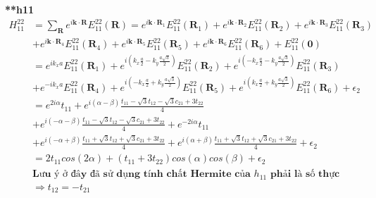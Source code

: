 \documentclass{report}
\begin{document}
\textbf{**h11}
\begin{align*}
    H^{22}_{11} & = \sum_{\mathbf{R}} e^{i \mathbf{k} \cdot \mathbf{R}} E^{22}_{11}(\mathbf{R})
    = e^{i \mathbf{k} \cdot \mathbf{R}_1} E^{22}_{11}(\mathbf{R}_1)
    + e^{i \mathbf{k} \cdot \mathbf{R}_2} E^{22}_{11}(\mathbf{R}_2)
    + e^{i \mathbf{k} \cdot \mathbf{R}_3} E^{22}_{11}(\mathbf{R}_3)                                                                                                                                                                 \\
                & + e^{i \mathbf{k} \cdot \mathbf{R}_4} E^{22}_{11}(\mathbf{R}_4)
    + e^{i \mathbf{k} \cdot \mathbf{R}_5} E^{22}_{11}(\mathbf{R}_5)
    + e^{i \mathbf{k} \cdot \mathbf{R}_6} E^{22}_{11}(\mathbf{R}_6)
    + E^{22}_{11}(\mathbf{0})                                                                                                                                                                                                       \\
                & = e^{i k_x a} E^{22}_{11}(\mathbf{R}_1)
    + e^{i \left( k_x \frac{a}{2} - k_y \frac{a\sqrt{3}}{2} \right)} E^{22}_{11}(\mathbf{R}_2)
    + e^{i \left( -k_x \frac{a}{2} - k_y \frac{a\sqrt{3}}{2} \right)} E^{22}_{11}(\mathbf{R}_3)                                                                                                                                     \\
                & + e^{-i k_x a } E^{22}_{11}(\mathbf{R}_4)
    + e^{i \left( -k_x \frac{a}{2} + k_y \frac{a\sqrt{3}}{2} \right)} E^{22}_{11}(\mathbf{R}_5)
    + e^{i \left( k_x \frac{a}{2} + k_y \frac{a\sqrt{3}}{2} \right)} E^{22}_{11}(\mathbf{R}_6) + \epsilon_2                                                                                                                         \\
                & = e^{2i\alpha} t_{11} + e^{i \left( \alpha - \beta \right)} \frac{t_{11} -\sqrt{3}t_{12} - \sqrt{3}c_{21} + 3t_{22}}{4}                                                                                           \\
                & + e^{i \left( -\alpha - \beta \right)} \frac{t_{11} -\sqrt{3}t_{12} - \sqrt{3}c_{21} + 3t_{22}}{4} + e^{-2i\alpha} t_{11}                                                                                         \\
                & + e^{i \left( -\alpha + \beta \right)} \frac{t_{11} +\sqrt{3}t_{12} + \sqrt{3}c_{21} + 3t_{22}}{4} + e^{i \left( \alpha + \beta \right)} \frac{t_{11} +\sqrt{3}t_{12} + \sqrt{3}c_{21} + 3t_{22}}{4} + \epsilon_2 \\
                & = 2t_{11}cos(2\alpha) + \left (t_{11} + 3t_{22}\right )cos(\alpha)cos(\beta) + \epsilon_2                                                                                                                         \\
                & \textbf{Lưu ý ở đây đã sử dụng tính chất Hermite của $h_{11}$ phải là số thực}                                                                                                                                    \\ &\Rightarrow t_{12} = - t_{21}
\end{align*}
\end{document}
